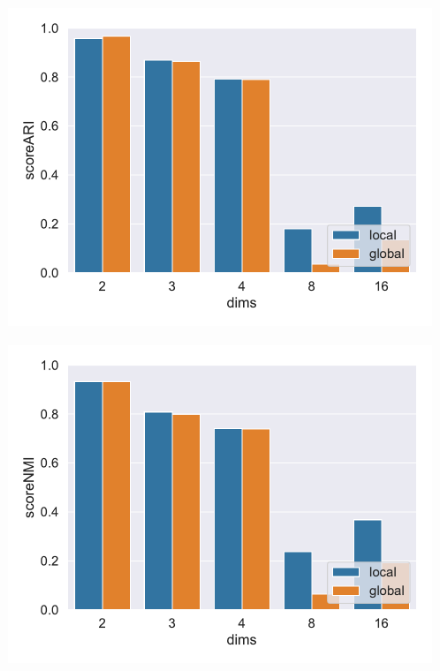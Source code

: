 \begin{figure}[h]
    \centering
    \begin{minipage}[t]{.5\textwidth}
      \centering  
      \captionsetup{width=.9\linewidth}
      \includegraphics[width=\textwidth]{evaluation/per_dims/Best_ARI_O10000_N5_pdims_bar.pdf}
      \label{fig:ariperpts}
    \end{minipage}%
    \begin{minipage}[t]{.5\textwidth}
      \centering
      \captionsetup{width=.9\linewidth}
      \includegraphics[width=\textwidth]{evaluation/per_dims/Best_NMI_O10000_N5_pdims_bar.pdf}
      \label{fig:nmiperpts}
    \end{minipage}
\end{figure}

